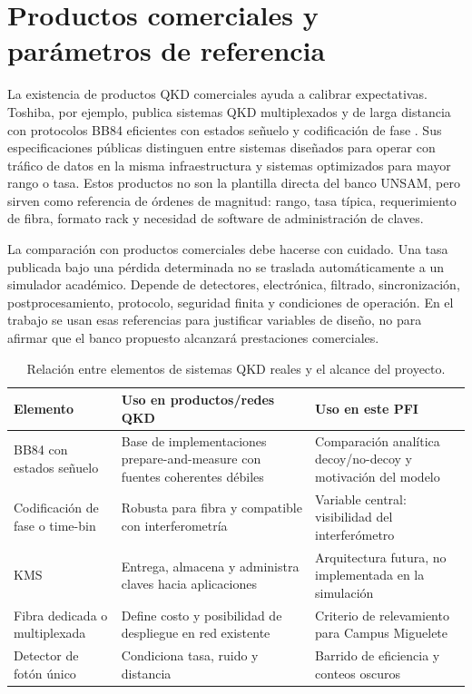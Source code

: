 \section{Productos comerciales y parámetros de referencia}

La existencia de productos QKD comerciales ayuda a calibrar expectativas. Toshiba, por ejemplo, publica sistemas QKD multiplexados y de larga distancia con protocolos BB84 eficientes con estados señuelo y codificación de fase \cite{toshibaQKDProducts}. Sus especificaciones públicas distinguen entre sistemas diseñados para operar con tráfico de datos en la misma infraestructura y sistemas optimizados para mayor rango o tasa. Estos productos no son la plantilla directa del banco UNSAM, pero sirven como referencia de órdenes de magnitud: rango, tasa típica, requerimiento de fibra, formato rack y necesidad de software de administración de claves.

La comparación con productos comerciales debe hacerse con cuidado. Una tasa publicada bajo una pérdida determinada no se traslada automáticamente a un simulador académico. Depende de detectores, electrónica, filtrado, sincronización, postprocesamiento, protocolo, seguridad finita y condiciones de operación. En el trabajo se usan esas referencias para justificar variables de diseño, no para afirmar que el banco propuesto alcanzará prestaciones comerciales.

\begin{table}[H]
  \centering
  \begin{tabularx}{\textwidth}{p{}XX}
    \toprule
    Elemento & Uso en productos/redes QKD & Uso en este PFI \\
    \midrule
    BB84 con estados señuelo & Base de implementaciones prepare-and-measure con fuentes coherentes débiles & Comparación analítica decoy/no-decoy y motivación del modelo \\
    Codificación de fase o time-bin & Robusta para fibra y compatible con interferometría & Variable central: visibilidad del interferómetro \\
    KMS & Entrega, almacena y administra claves hacia aplicaciones & Arquitectura futura, no implementada en la simulación \\
    Fibra dedicada o multiplexada & Define costo y posibilidad de despliegue en red existente & Criterio de relevamiento para Campus Miguelete \\
    Detector de fotón único & Condiciona tasa, ruido y distancia & Barrido de eficiencia y conteos oscuros \\
    \bottomrule
  \end{tabularx}
  \caption{Relación entre elementos de sistemas QKD reales y el alcance del proyecto.}
  \label{tab:productos_pfi}
\end{table}

